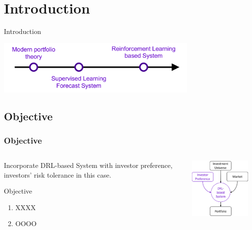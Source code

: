  \section{Introduction}


\begin{frame}{Introduction}
       \tableofcontents[sectionstyle=show/hide, hideothersubsections]
    \begin{center}
    \includegraphics[width=10cm]{images/portfolio_introduction.png}
    \end{center}
\end{frame}


\subsection{Objective}
\begin{frame}
\frametitle{Objective}
\begin{columns}
\begin{column}{0.55\textwidth}
Incorporate DRL-based System with investor preference, \alert{investors' risk tolerance} in this case.


\begin{block}{Objective}
\begin{enumerate}
    \item XXXX
    \item OOOO
\end{enumerate}
\end{block}
\end{column}
\begin{column}{0.45\textwidth}
\begin{center}
\includegraphics[width=4.8cm]{images/rl2.png}
\end{center}
\end{column}
\end{columns}
\end{frame}


